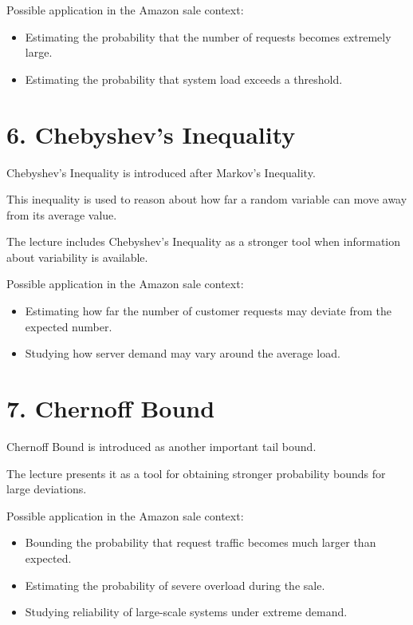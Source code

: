\documentclass[12pt]{article}
\begin{document}
Possible application in the Amazon sale context:

\begin{itemize}
    \item Estimating the probability that the number of requests becomes extremely large.
    \item Estimating the probability that system load exceeds a threshold.
\end{itemize}

\section*{6. Chebyshev’s Inequality}

Chebyshev’s Inequality is introduced after Markov’s Inequality.

This inequality is used to reason about how far a random variable can move away from its average value.

The lecture includes Chebyshev’s Inequality as a stronger tool when information about variability is available.

Possible application in the Amazon sale context:

\begin{itemize}
    \item Estimating how far the number of customer requests may deviate from the expected number.
    \item Studying how server demand may vary around the average load.
\end{itemize}

\section*{7. Chernoff Bound}

Chernoff Bound is introduced as another important tail bound.

The lecture presents it as a tool for obtaining stronger probability bounds for large deviations.

Possible application in the Amazon sale context:

\begin{itemize}
    \item Bounding the probability that request traffic becomes much larger than expected.
    \item Estimating the probability of severe overload during the sale.
    \item Studying reliability of large-scale systems under extreme demand.
\end{itemize}
\end{document}
